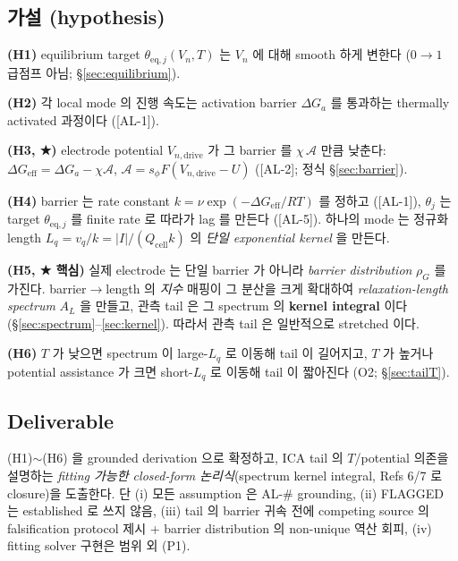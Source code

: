 \documentclass[11pt,a4paper]{article}
\newcommand{\eff}{\mathrm{eff}}
\newcommand{\eq}{\mathrm{eq}}
\newcommand{\dimedrive}{\mathrm{drive}}
\newcommand{\cell}{\mathrm{cell}}
\newcommand{\AL}[1]{\textsf{[AL-#1]}}
\begin{document}
\subsection{가설 (hypothesis)}\label{sec:hypothesis}
\textbf{(H1)} equilibrium target $\theta_{\eq,j}(V_n,T)$ 는 $V_n$ 에 대해 smooth 하게
변한다 ($0\!\to\!1$ 급점프 아님; \S\ref{sec:equilibrium}).

\textbf{(H2)} 각 local mode 의 진행 속도는 activation barrier $\Delta G_{a}$ 를 통과하는
thermally activated 과정이다 (\AL{1}).

\textbf{(H3, ★)} electrode potential $V_{n,\dimedrive}$ 가 그 barrier 를 $\chi\,\mathcal A$
만큼 낮춘다: $\Delta G_\eff = \Delta G_a - \chi\mathcal A$, $\mathcal A=s_\phi F(V_{n,\dimedrive}-U)$
(\AL{2}; 정식 \S\ref{sec:barrier}).

\textbf{(H4)} barrier 는 rate constant $k=\nu\exp(-\Delta G_\eff/RT)$ 를 정하고 (\AL{1}),
$\theta_j$ 는 target $\theta_{\eq,j}$ 를 finite rate 로 따라가 lag 를 만든다 (\AL{5}).
하나의 mode 는 정규화 length $L_q=v_q/k=|I|/(Q_\cell k)$ 의 \emph{단일 exponential kernel} 을 만든다.

\textbf{(H5, ★ 핵심)} 실제 electrode 는 단일 barrier 가 아니라 \emph{barrier
distribution} $\rho_G$ 를 가진다. barrier$\to$length 의 \emph{지수} 매핑이 그 분산을
크게 확대하여 \emph{relaxation-length spectrum} $A_L$ 을 만들고, 관측 tail 은 그 spectrum
의 \textbf{kernel integral} 이다 (\S\ref{sec:spectrum}--\ref{sec:kernel}). 따라서 관측
tail 은 일반적으로 stretched 이다.

\textbf{(H6)} $T$ 가 낮으면 spectrum 이 large-$L_q$ 로 이동해 tail 이 길어지고, $T$ 가
높거나 potential assistance 가 크면 short-$L_q$ 로 이동해 tail 이 짧아진다 (O2; \S\ref{sec:tailT}).

\subsection{Deliverable}\label{sec:deliverable}
(H1)$\sim$(H6) 을 grounded derivation 으로 확정하고, ICA tail 의 $T$/potential 의존을
설명하는 \emph{fitting 가능한 closed-form 논리식}(spectrum kernel integral, Refs 6/7 로
closure)을 도출한다. 단 (i) 모든 assumption 은 AL-\# grounding, (ii) FLAGGED 는 established
로 쓰지 않음, (iii) tail 의 barrier 귀속 전에 competing source 의 falsification protocol
제시 + barrier distribution 의 non-unique 역산 회피, (iv) fitting solver 구현은 범위 외 (P1).
\end{document}

